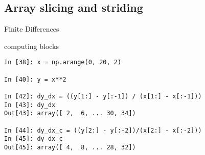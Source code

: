 \subsection{Array slicing and striding}

\begin{frame}[fragile]
Finite Differences
 \begin{block}{computing blocks}
   \begin{verbatim}
In [38]: x = np.arange(0, 20, 2)

In [40]: y = x**2

In [42]: dy_dx = ((y[1:] - y[:-1]) / (x[1:] - x[:-1]))
In [43]: dy_dx
Out[43]: array([ 2,  6, ... 30, 34])

In [44]: dy_dx_c = ((y[2:] - y[:-2])/(x[2:] - x[:-2]))
In [45]: dy_dx_c
Out[45]: array([ 4,  8, ... 28, 32])
\end{verbatim}
 \end{block}
\end{frame}


